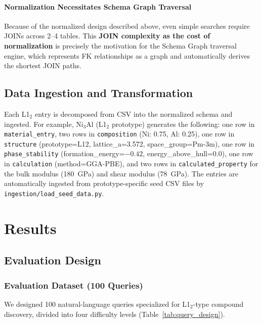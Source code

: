 \documentclass[5p,twocolumn]{elsarticle}
\begin{document}
\paragraph{Normalization Necessitates Schema Graph Traversal}
Because of the normalized design described above,
even simple searches require JOINs across 2--4 tables.
This \textbf{JOIN complexity as the cost of normalization} is precisely the motivation
for the Schema Graph traversal engine, which represents FK relationships as a graph
and automatically derives the shortest JOIN paths.

\subsection{Data Ingestion and Transformation}

Each L1$_2$ entry is decomposed from CSV into the normalized schema and ingested.
For example, Ni$_3$Al (L1$_2$ prototype) generates the following:
one row in \texttt{material\_entry},
two rows in \texttt{composition} (Ni: 0.75, Al: 0.25),
one row in \texttt{structure} (prototype=L12, lattice\_a=3.572, space\_group=Pm-3m),
one row in \texttt{phase\_stability} (formation\_energy=$-0.42$, energy\_above\_hull=0.0),
one row in \texttt{calculation} (method=GGA-PBE),
and two rows in \texttt{calculated\_property} for the bulk modulus (180~GPa) and shear modulus (78~GPa).
The entries are automatically ingested from prototype-specific seed CSV files
by \texttt{ingestion/load\_seed\_data.py}.
\section{Results}
\label{sec:results}

\subsection{Evaluation Design}

\subsubsection{Evaluation Dataset (100 Queries)}

We designed 100 natural-language queries specialized for L1$_2$-type compound discovery,
divided into four difficulty levels (Table~\ref{tab:query_design}).
\end{document}
